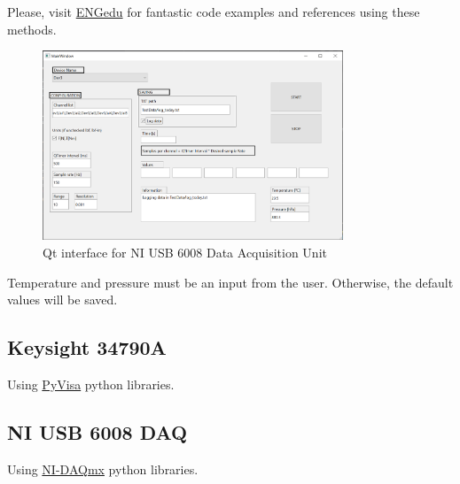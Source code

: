 \documentclass[a4paper]{article}
\begin{document}
Please, visit \hyperref{http://engredu.com/2023/07/29/ni-acquisition-strategies/}{category}{name}{ENGedu} for fantastic code examples and references using these methods.

\begin{figure}[h!]
	\centering
	\includegraphics[width=0.8\textwidth]{NIUSB6008_GUI.png}
	\caption{Qt interface for NI USB 6008 Data Acquisition Unit}
	\label{fig:NIUSB6008_GUI}
\end{figure}

Temperature and pressure must be an input from the user. Otherwise, the default values will be saved.

\subsection{Keysight 34790A}

Using \hyperref{https://pyvisa.readthedocs.io/en/latest/index.html}{name}{category}{PyVisa} python libraries.

\subsection{NI USB 6008 DAQ}
\label{sec:NiDAQ_PY}
Using \hyperref{https://nidaqmx-python.readthedocs.io/en/latest/}{name}{cat}{NI-DAQmx} python libraries.
\end{document}
